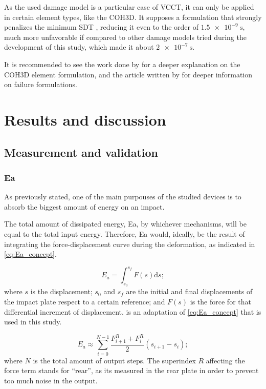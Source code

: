 \documentclass[
documentsize = a4, %
font = cmr, %
typesize = 11, %
printmode = true,
onehalfspacing = true,
language = en, %
titlepage = udciccp, %
degree = pt, %
dedication = true,
acknowledgements = true,
abstract-en = true,
abstract-es = false,
abstract-ga = false,
epigraphs = true,
toc = true,
lof = true,
lot = true,
frontmatterintoc = false,
notation = false,
minimal = false,
]{UDCthesis}
\begin{document}
As the used damage model is a particular case of \gls{VCCT}, it can only be applied in certain element types, like the \gls{COH3D}. It supposes a formulation that strongly penalizes the minimum \gls{SDT} \citep{Abaqus613Manual}, reducing it even to the order of $\SI{1.5e-9}{\s}$, much more unfavorable if compared to other damage models tried during the development of this study, which made it about $\SI{2e-7}{\s}$.

It is recommended to see the work done by \citet{Alfano2001} for a deeper explanation on the \gls{COH3D} element formulation, and the article written by \citet{May2014} for deeper information on failure formulations.

\chapter{Results and discussion}
\label{results}

\section{Measurement and validation}

\subsection{\Acrlong{Ea}}  %
\label{sec:Ea}

As previously stated, one of the main purpouses of the studied devices is to absorb the biggest amount of energy on an impact.

The total amount of dissipated energy, \gls{Ea}, by whichever mechanisms, will be equal to the total input energy. Therefore, \gls{Ea} would, ideally, be the result of integrating the force-displacement curve during the deformation, as indicated in \cref{eq:Ea_concept}.

\begin{equation}
E_a = \int_{s_0}^{s_f} F(s) \mathrm{d}s ;
\label{eq:Ea_concept}
\end{equation}
where $s$ is the displacement; $s_0$ and $s_f$ are the initial and final displacements of the impact plate respect to a certain reference; and $F(s)$ is the force for that differential increment of displacement.  is an adaptation of \cref{eq:Ea_concept} that is used in this study.

\begin{equation}
E_a \approx \displaystyle\sum_{i=0}^{N-1} \frac{F_{i+1}^R+F_{i}^R}{2} \left(s_{i+1}-s_{i}\right) ;
\label{eq:Ea_approx}
\end{equation}
where $N$ is the total amount of output steps. The superindex $R$ affecting the force term stands for ``rear'', as its measured in the rear plate in order to prevent too much noise in the output.
\end{document}
